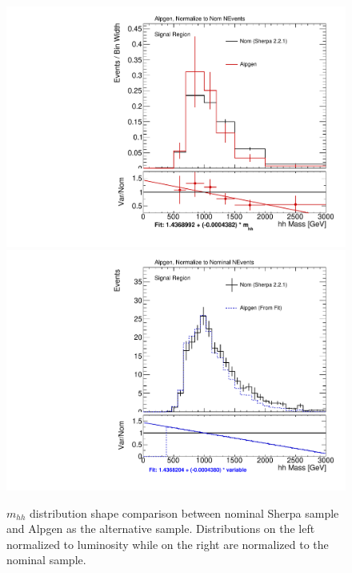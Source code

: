 \begin{figure}[!htbp]
\begin{center}
\includegraphics[scale=0.33]{./figures/boosted/systematics/wjets_alt_hhMass_SR_syst_Alpgen_rebin} 
\includegraphics[scale=0.33]{./figures/boosted/systematics/wjets_fromfit_hhMass_SR_Alpgen}\\
\caption{$m_{hh}$ distribution shape comparison between nominal Sherpa sample and Alpgen as the alternative sample. Distributions on the left 
normalized to luminosity while on the right are normalized to the nominal sample.}
\label{fig:boosted_systematics_wjets_sr_alpgen}
\end{center}
\end{figure}

\FloatBarrier
%
%
